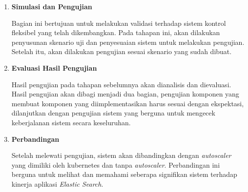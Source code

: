 \begin{enumerate}
\begin{enumerate}

        

        

        

        \item \textbf{Simulasi dan Pengujian}
        
        Bagian ini bertujuan untuk melakukan validasi terhadap sistem kontrol fleksibel yang telah dikembangkan. Pada tahapan ini, akan dilakukan penyusunan skenario uji dan penyesuaian sistem untuk melakukan pengujian. Setelah itu, akan dilakukan pengujian sesuai skenario yang sudah dibuat.
    
        \item \textbf{Evaluasi Hasil Pengujian}
        
        Hasil pengujian pada tahapan sebelumnya akan dianalisis dan dievaluasi. Hasil pengujian akan dibagi menjadi dua bagian, pengujian komponen yang membuat komponen yang diimplementasikan harus sesuai dengan ekspektasi, dilanjutkan dengan pengujian sistem yang berguna untuk mengecek keberjalanan sistem secara keseluruhan.

        \item \textbf{Perbandingan}
        
        Setelah melewati pengujian, sistem akan dibandingkan dengan \textit{autoscaler} yang dimiliki oleh kubernetes dan tanpa \textit{autoscaler}. Perbandingan ini berguna untuk melihat dan memahami seberapa signifikan sistem terhadap kinerja aplikasi \textit{Elastic Search}.
    \end{enumerate}
\end{enumerate}
